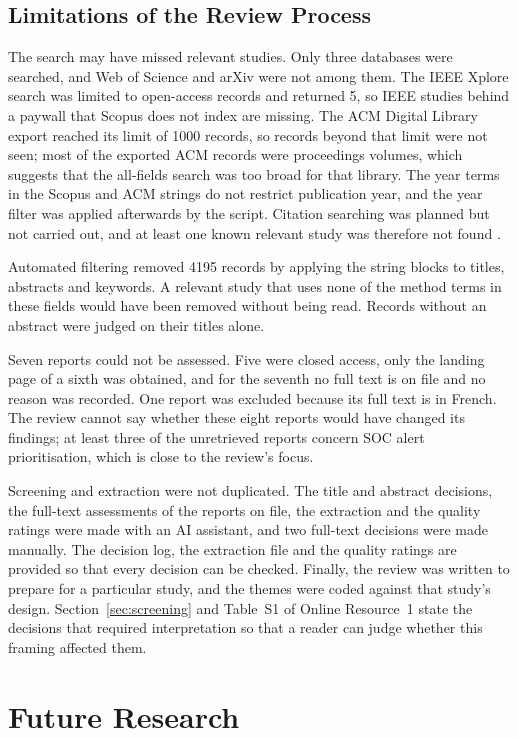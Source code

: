 \documentclass[pdflatex,sn-basic]{sn-jnl}
\begin{document}
\subsection{Limitations of the Review Process}

The search may have missed relevant studies. Only three databases were searched, and Web of Science and arXiv were not among them. The IEEE Xplore search was limited to open-access records and returned 5, so IEEE studies behind a paywall that Scopus does not index are missing. The ACM Digital Library export reached its limit of 1000 records, so records beyond that limit were not seen; most of the exported ACM records were proceedings volumes, which suggests that the all-fields search was too broad for that library. The year terms in the Scopus and ACM strings do not restrict publication year, and the year filter was applied afterwards by the script. Citation searching was planned but not carried out, and at least one known relevant study was therefore not found \citep{ren2025}.

Automated filtering removed 4195 records by applying the string blocks to titles, abstracts and keywords. A relevant study that uses none of the method terms in these fields would have been removed without being read. Records without an abstract were judged on their titles alone.

Seven reports could not be assessed. Five were closed access, only the landing page of a sixth was obtained, and for the seventh no full text is on file and no reason was recorded. One report was excluded because its full text is in French. The review cannot say whether these eight reports would have changed its findings; at least three of the unretrieved reports concern SOC alert prioritisation, which is close to the review's focus.

Screening and extraction were not duplicated. The title and abstract decisions, the full-text assessments of the reports on file, the extraction and the quality ratings were made with an AI assistant, and two full-text decisions were made manually. The decision log, the extraction file and the quality ratings are provided so that every decision can be checked. Finally, the review was written to prepare for a particular study, and the themes were coded against that study's design. Section~\ref{sec:screening} and Table~S1 of Online Resource~1 state the decisions that required interpretation so that a reader can judge whether this framing affected them.

\section{Future Research}
\label{sec:future}
\end{document}
